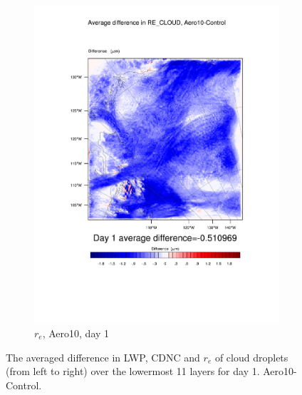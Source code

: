 \begin{figure}[hb]
	\begin{subfigure}{0.40\textwidth}
		\centering
		\includegraphics[width=\textwidth]{results/aero10/diff_Aero10_RE_CLOUD_Day1.pdf}
		\caption{$r_e$, Aero10, day 1}
		\label{subfig:recloud_r3Day1}
	\end{subfigure}
\caption{The averaged difference in LWP, CDNC and $r_e$ of cloud droplets (from left to right) over the lowermost 11 layers for day 1. Aero10-Control.}
\label{fig:lwpcdncre_r3Day1}
\end{figure}

